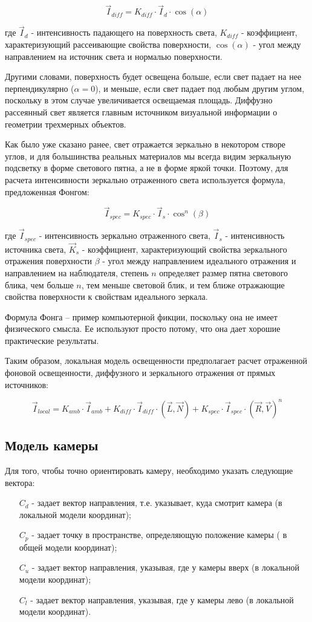 \documentclass[12pt, a4paper, utf8]{article}
\begin{document}
$$
 \vec{I}_{diff} = K_{diff} \cdot \vec{I}_{d} \cdot \cos(\alpha)
$$
 
где $\vec{I}_{d}$ - интенсивность падающего на поверхность света, $K_{diff}$ - коэффициент, характеризующий рассеивающие свойства поверхности, $\cos(\alpha)$ - угол между направлением на источник света и нормалью поверхности.

Другими словами, поверхность будет освещена больше, если свет падает на нее перпендикулярно ($\alpha = 0$), и меньше, если свет падает под любым другим углом, поскольку в этом случае увеличивается освещаемая площадь. Диффузно рассеянный свет является главным источником визуальной информации о геометрии трехмерных объектов.

Как было уже сказано ранее, свет отражается зеркально в некотором створе углов, и для большинства реальных материалов мы всегда видим зеркальную подсветку в форме светового пятна, а не в форме яркой точки. Поэтому, для расчета интенсивности зеркально отраженного света используется формула, предложенная Фонгом:

$$
 \vec{I}_{spec} = K_{spec} \cdot \vec{I}_{s} \cdot \cos^n(\beta)
$$

где $\vec{I}_{spec}$ - интенсивность зеркально отраженного света,  $\vec{I}_{s}$ - интенсивность источника света,  $\vec{K}_{s}$ - коэффициент, характеризующий свойства зеркального отражения поверхности
$\beta$ - угол между направлением идеального отражения и направлением на наблюдателя, степень $n$ определяет размер пятна светового блика, чем больше $n$, тем меньше световой блик, и тем ближе отражающие свойства поверхности к свойствам идеального зеркала.

Формула Фонга – пример компьютерной фикции, поскольку она не имеет физического смысла. Ее используют просто потому, что она дает хорошие практические результаты. 

Таким образом, локальная модель освещенности предполагает расчет отраженной фоновой освещенности, диффузного и зеркального отражения от прямых источников: 

$$
 \vec{I}_{local} =  K_{amb} \cdot \vec{I}_{amb} +  K_{diff} \cdot \vec{I}_{diff} \cdot \left( \vec{L},\vec{N} \right) + K_{spec} \cdot \vec{I}_{spec} \cdot \left( \vec{R},\vec{V} \right)^n
$$

\subsection{Модель камеры}

\noindent
Для того, чтобы точно ориентировать камеру, необходимо указать следующие вектора:
\begin{itemize}
\item[$C_d$] - задает вектор направления, т.е. указывает, куда смотрит камера (в локальной модели координат);
\item[$C_p$] - задает точку в пространстве, определяющую положение камеры ( в общей модели координат);
\item[$C_u$] - задает вектор направления, указывая, где у камеры вверх (в локальной модели координат);
\item[$C_l$] - задает вектор направления, указывая, где у камеры лево (в локальной модели координат).
\end{itemize}
\end{document}
